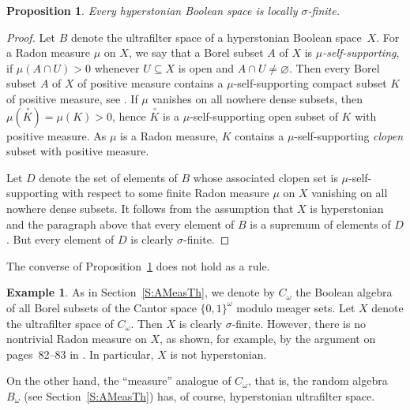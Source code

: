 \documentclass[psamsfonts,reqno]{memo-l}
\theoremstyle{plain}
\newtheorem{proposition}[lemma]{Proposition}
\theoremstyle{definition}
\newtheorem{example}[lemma]{Example}
\theoremstyle{remark}
\numberwithin{equation}{section}
\newcommand{\es}{\varnothing}
\newcommand{\Co}{C_{\omega}}
\newcommand{\set}[1]{\{#1\}}
\begin{document}
\begin{proposition}\label{P:Hyp2sF}
Every hyperstonian Boolean space is locally
$\sigma$-finite.
\end{proposition}

\begin{proof}
Let $B$ denote the ultrafilter space of a hyperstonian Boolean
space~$X$. For a Radon measure $\mu$ on $X$, we say
that a Borel subset $A$ of $X$ is \emph{$\mu$-self-supporting},
 if $\mu(A\cap U)>0$ whenever
$U\subseteq X$ is open and $A\cap U\neq\es$. Then every Borel subset $A$
of $X$ of positive measure contains a $\mu$-self-supporting compact subset
$K$ of positive measure, see \cite[\S1.9]{Frem}. If
$\mu$ vanishes on all nowhere dense subsets, then
$\mu(\overset{\,\circ}{K})=\mu(K)>0$, hence
$\overset{\,\circ}{K}$ is a $\mu$-self-supporting open subset of $K$ with
positive measure. As $\mu$ is a Radon measure, $K$ contains a
$\mu$-self-supporting \emph{clopen} subset with positive measure.

Let $D$ denote the set of elements of $B$ whose associated clopen set is
$\mu$-self-supporting with respect to some finite Radon measure $\mu$ on
$X$ vanishing on all nowhere dense subsets. It follows from the
assumption that $X$ is hyperstonian and the paragraph
above that every element of $B$ is a supremum of elements of $D$. But every
element of $D$ is clearly $\sigma$-finite.
\end{proof}

The converse of Proposition~\ref{P:Hyp2sF} does not hold as a rule.

\begin{example}\label{Ex:SFnonHS}
As in Section~\ref{S:AMeasTh}, we denote by $\Co$ the Boolean algebra
of all Borel subsets of the Cantor space $\set{0,1}^\omega$ modulo meager
sets. Let $X$ denote the ultrafilter space of
$\Co$. Then $X$ is clearly $\sigma$-finite. However, there is no
nontrivial Radon measure on $X$, as shown, for example, by the argument on
pages~82--83 in \cite[Chapter~21]{Oxto}. In
particular, $X$ is not hyperstonian.
\end{example}

On the other hand, the ``measure'' analogue of $C_{\omega}$, that is, the
random algebra~$B_{\omega}$ (see Section~\ref{S:AMeasTh}) has, of course,
hyperstonian ultrafilter space.
\end{document}
